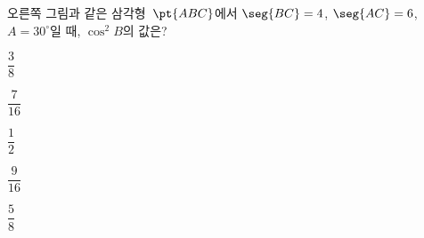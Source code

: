 \noindent\begin{minipage}[t]{0.58\linewidth}\vspace{0pt}\raggedright 오른쪽 그림과 같은 삼각형~$\pt{ABC}$에서 $\seg{BC}=4$, $\seg{AC}=6$, $A=30^\circ$일 때, $\cos^2 B$의 값은?\end{minipage}\hfill\begin{minipage}[t]{0.4\linewidth}\vspace{0pt}\centering \resizebox{\ifdim\width>\linewidth\linewidth\else\width\fi}{!}{}\end{minipage}\par
\begin{choicesii}{\rule[-3ex]{0pt}{8ex}$\dfrac{3}{8}$}{\rule[-3ex]{0pt}{8ex}$\dfrac{7}{16}$}{\rule[-3ex]{0pt}{8ex}$\dfrac{1}{2}$}{\rule[-3ex]{0pt}{8ex}$\dfrac{9}{16}$}{\rule[-3ex]{0pt}{8ex}$\dfrac{5}{8}$}\end{choicesii}
